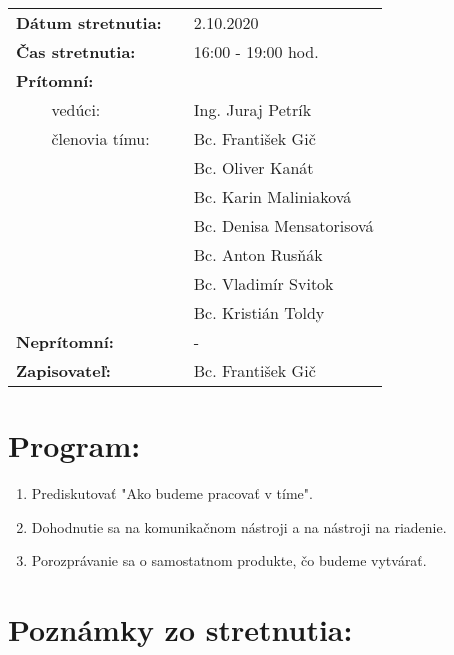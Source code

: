 \documentclass{article}
\begin{document}
    

    \begin{table}[h]
        \begin{tabular}{lllll}
            \multicolumn{3}{l}{\textbf{Dátum stretnutia:}} & & 2.10.2020 \\
            \multicolumn{3}{l}{\textbf{Čas stretnutia:}} & & 16:00 - 19:00 hod. \\
            \multicolumn{3}{l}{\textbf{Prítomní:}} \\
            & & vedúci: & & Ing. Juraj Petrík \\
            & & členovia tímu: & & Bc. František Gič  \\
            & & & & Bc. Oliver Kanát \\
            & & & & Bc. Karin Maliniaková \\
            & & & & Bc. Denisa Mensatorisová \\
            & & & & Bc. Anton Rusňák \\
            & & & & Bc. Vladimír Svitok \\
            & & & & Bc. Kristián Toldy \\
            \multicolumn{3}{l}{\textbf{Neprítomní:}} & & -\\
            \multicolumn{3}{l}{\textbf{Zapisovateľ:}} & & Bc. František Gič \\
        \end{tabular}
        \label{tab:grades}
    \end{table}

    \section*{Program:}

    \begin{enumerate}
        \item Prediskutovať "Ako budeme pracovať v tíme".
        \item Dohodnutie sa na komunikačnom nástroji a na nástroji na riadenie.
        \item Porozprávanie sa o samostatnom produkte, čo budeme vytvárať.
    \end{enumerate}

    \section*{Poznámky zo stretnutia:}
\end{document}
